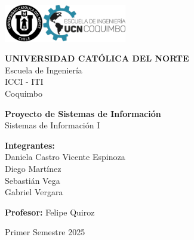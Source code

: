 \documentclass[12pt,letterpaper]{report}
\begin{document}
\begin{titlepage}
    \centering
    \vspace*{1cm}
    \includegraphics[width=0.4\textwidth]{ucn-EIC.pdf}
    \vspace{1cm}
    
    {\LARGE \textbf{UNIVERSIDAD CATÓLICA DEL NORTE}}\\
    \vspace{0.5cm}
    {\large Escuela de Ingeniería}\\
    \vspace{0.3cm}
    {\large ICCI - ITI}\\
    \vspace{0.3cm}
    {\large Coquimbo}\\
    \vspace{1.5cm}
    
    {\Huge \textbf{Proyecto de Sistemas de Información}}\\
    \vspace{0.5cm}
    {\LARGE Sistemas de Información I}\\
    \vspace{1.5cm}
    
    {\large \textbf{Integrantes:}}\\
    \vspace{0.3cm}
    {\large Daniela Castro }
    {\large Vicente Espinoza }\\
    {\large Diego Martínez}\\
    {\large Sebastián Vega}\\
    {\large Gabriel Vergara}\\
    \vspace{1.5cm}
    
    {\large \textbf{Profesor:} Felipe Quiroz}\\
    \vspace{1.5cm}
    
    {\large Primer Semestre 2025}
    
\end{titlepage}

\tableofcontents
\newpage
\end{document}
